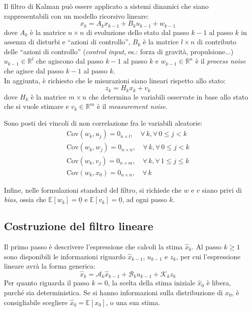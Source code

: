 \documentclass[12pt,a4paper,openright,twoside]{book}
\begin{document}
Il filtro di Kalman può essere applicato a sistemi dinamici che siano rappresentabili con un modello ricorsivo lineare:
\begin{equation}
x_k=A_kx_{k-1}+B_ku_{k-1}+w_{k-1}
\end{equation}
dove $A_k$ è la matrice $n\times n$ di evoluzione dello stato dal passo $k-1$ al passo $k$ in assenza di disturbi e ``azioni di controllo'', $B_k$ è la matrice $l\times n$ di contributo delle ``azioni di controllo'' (\textit{control input}, es.: forza di gravità, propulsione...) $u_{k-1}\in\mathbb{R}^l$ che agiscono dal passo $k-1$ al passo $k$ e $w_{k-1}\in\mathbb{R}^n$ è il \textit{process noise} che agisce dal passo $k-1$ al passo $k$. \\

In aggiunta, è richiesto che le misurazioni siano lineari rispetto allo stato:
\begin{equation}
z_k=H_kx_k+v_k
\end{equation}
dove $H_k$ è la matrice $m\times n$ che determina le variabili osservate in base allo stato che si vuole stimare e $v_k\in\mathbb{R}^m$ è il \textit{measurement noise}.
\pagebreak

Sono posti dei vincoli di non correlazione fra le variabili aleatorie:
\begin{gather*}
\mathrm{Cov}(w_k,u_j)=0_{n\times l},\quad\forall\,k,\forall\,0\leq j<k \\
\mathrm{Cov}(w_k,w_j)=0_{n\times n},\quad\forall\,k,\forall\,0\leq j<k \\
\mathrm{Cov}(w_k,v_j)=0_{n\times m},\quad\forall\,k,\forall\,1\leq j\leq k \\
\mathrm{Cov}(w_k,x_0)=0_{n\times n},\quad\forall\,k
\end{gather*}

Infine, nelle formulazioni standard del filtro, si richiede che $w$ e $v$ siano privi di \textit{bias}, ossia che $\mathbb{E}[w_k]=\underline{0}$ e $\mathbb{E}[v_k]=\underline{0}$, ad ogni passo $k$.

\subsection{Costruzione del filtro lineare}

Il primo passo è descrivere l'espressione che calcoli la stima $\hat{x}_k$. Al passo $k\geq 1$ sono disponibili le informazioni riguardo $\hat{x}_{k-1}$, $u_{k-1}$ e $z_k$, per cui l'espressione lineare avrà la forma generica:
\begin{equation*}
\hat{x}_k=\mathcal{A}_k\hat{x}_{k-1}+\mathcal{B}_ku_{k-1}+\mathcal{K}_kz_k
\end{equation*}
Per quanto riguarda il passo $k=0$, la scelta della stima iniziale $\hat{x}_0$ è libera, purché sia deterministica. Se si hanno informazioni sulla distribuzione di $x_0$, è consigliabile scegliere $\hat{x}_0=\mathbb{E}[x_0]$, o una sua stima. \\
\end{document}
